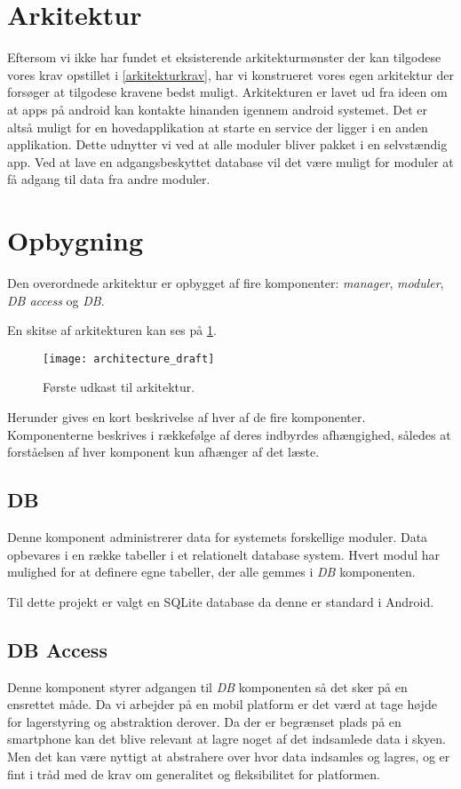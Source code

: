 \section{Arkitektur}
Eftersom vi ikke har fundet et eksisterende arkitekturmønster der kan tilgodese vores krav opstillet i \cref{arkitekturkrav}, har vi konstrueret vores egen arkitektur der forsøger at tilgodese kravene bedst muligt.
Arkitekturen er lavet ud fra ideen om at apps på android kan kontakte hinanden igennem android systemet. 
Det er altså muligt for en hovedapplikation at starte en service der ligger i en anden applikation.
Dette udnytter vi ved at alle moduler bliver pakket i en selvstændig app. 
Ved at lave en adgangsbeskyttet database vil det være muligt for moduler at få adgang til data fra andre moduler.

\section*{Opbygning}
Den overordnede arkitektur er opbygget af fire komponenter: \textit{manager}, \textit{moduler}, \textit{DB access} og \textit{DB}.

En skitse af arkitekturen kan ses på \cref{arkitektur_udkast_1}.
\begin{figure}[h]
	\centering
	\texttt{[image: architecture\_draft]}
	\caption{Første udkast til arkitektur.}
  \label{arkitektur_udkast_1}
\end{figure}

Herunder gives en kort beskrivelse af hver af de fire komponenter.
Komponenterne beskrives i rækkefølge af deres indbyrdes afhængighed, således at forståelsen af hver komponent kun afhænger af det læste.

\subsection*{DB}
Denne komponent administrerer data for systemets forskellige moduler.
Data opbevares i en række tabeller i et relationelt database system.
Hvert modul har mulighed for at definere egne tabeller, der alle gemmes i \textit{DB} komponenten.

Til dette projekt er valgt en SQLite database da denne er standard i Android.


\subsection*{DB Access}
Denne komponent styrer adgangen til \textit{DB} komponenten så det sker på en ensrettet måde.
Da vi arbejder på en mobil platform er det værd at tage højde for lagerstyring og abstraktion derover.
Da der er begrænset plads på en smartphone kan det blive relevant at lagre noget af det indsamlede data i skyen.
Men det kan være nyttigt at abstrahere over hvor data indsamles og lagres, og er fint i tråd med de krav om generalitet og fleksibilitet for platformen.


